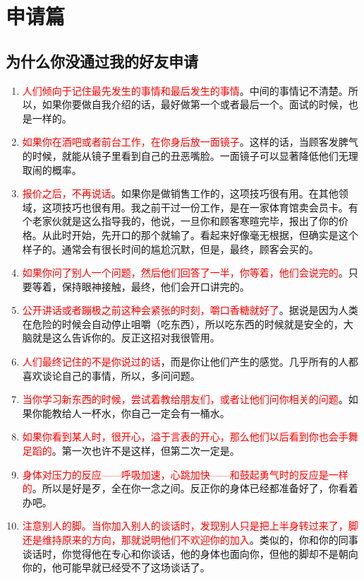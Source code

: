 \documentclass[12pt,oneside]{book}
\begin{document}


\tableofcontents

\chapter{申请篇}

\section{为什么你没通过我的好友申请}
\begin{tcolorbox}[colback=orange!5,colframe=orange!75!black]
\begin{enumerate}
	\item \textcolor{red}{人们倾向于记住最先发生的事情和最后发生的事情}。中间的事情记不清楚。所以，如果你要做自我介绍的话，最好做第一个或者最后一个。面试的时候，也是一样的。
	\item \textcolor{red}{如果你在酒吧或者前台工作，在你身后放一面镜子}。这样的话，当顾客发脾气的时候，就能从镜子里看到自己的丑恶嘴脸。一面镜子可以显著降低他们无理取闹的概率。
	\item \textcolor{red}{报价之后，不再说话}。如果你是做销售工作的，这项技巧很有用。在其他领域，这项技巧也很有用。我之前干过一份工作，是在一家体育馆卖会员卡。有个老家伙就是这么指导我的，他说，一旦你和顾客寒暄完毕，报出了你的价格。从此时开始，先开口的那个就输了。看起来好像毫无根据，但确实是这个样子的。通常会有很长时间的尴尬沉默，但是，最终，顾客会买的。
\item \textcolor{red}{如果你问了别人一个问题，然后他们回答了一半，你等着，他们会说完的}。只要等着，保持眼神接触，最终，他们会开口讲完的。
\item \textcolor{red}{公开讲话或者蹦极之前这种会紧张的时刻，嚼口香糖就好了}。据说是因为人类在危险的时候会自动停止咀嚼（吃东西），所以吃东西的时候就是安全的，大脑就是这么告诉你的。反正这招对我很管用。
\item \textcolor{red}{人们最终记住的不是你说过的话}，而是你让他们产生的感觉。几乎所有的人都喜欢谈论自己的事情，所以，多问问题。
\item \textcolor{red}{当你学习新东西的时候，尝试着教给朋友们，或者让他们问你相关的问题}。如果你能教给人一杯水，你自己一定会有一桶水。
\item \textcolor{red}{如果你看到某人时，很开心，溢于言表的开心，那么他们以后看到你也会手舞足蹈的}。第一次也许不是这样，但第二次一定是。
\item \textcolor{red}{身体对压力的反应——呼吸加速，心跳加快——和鼓起勇气时的反应是一样的}。所以是好是歹，全在你一念之间。反正你的身体已经都准备好了，你看着办吧。
\item \textcolor{red}{注意别人的脚。当你加入别人的谈话时，发现别人只是把上半身转过来了，脚还是维持原来的方向，那就说明他们不欢迎你的加入}。类似的，你和你的同事谈话时，你觉得他在专心和你谈话，他的身体也面向你，但他的脚却不是朝向你的，他可能早就已经受不了这场谈话了。
\end{enumerate}
\end{tcolorbox}
\end{document}
